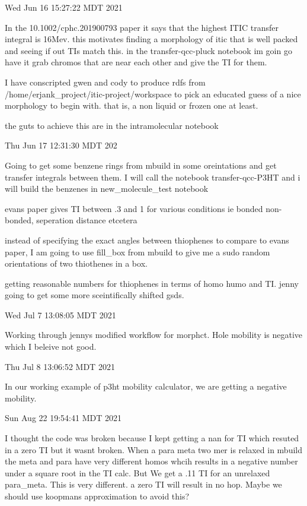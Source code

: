 
Wed Jun 16 15:27:22 MDT 2021
    
       In the 10.1002/cphc.201900793 paper it says that the highest ITIC transfer integral 
       is 16Mev. this motivates finding a morphology of itic that is well packed and 
       seeing if out TIs match this. in the transfer-qcc-pluck notebook im goin go 
       have it grab chromos that are near each other and give the TI for them.
    
        I have conscripted gwen and cody to produce rdfs from /home/erjank_project/itic-project/workspace 
        to pick an educated guess of a nice morphology to begin with. that is, a non liquid or frozen one
        at least.

        the guts to achieve this are in the intramolecular notebook

Thu Jun 17 12:31:30 MDT 202

      Going to get some benzene rings from mbuild in some oreintations and get transfer integrals 
      between them. I will call the notebook transfer-qcc-P3HT and i will build the benzenes in 
      new_molecule_test notebook

      evans paper gives TI between .3 and 1 for various conditions ie bonded non-bonded, seperation
      distance etcetera

      instead of specifying the exact angles between thiophenes to compare to evans paper,
      I am going to use fill_box from mbuild to give me a sudo random orientations of two
      thiothenes in a box.

      getting reasonable numbers for thiophenes in terms of homo humo and TI. jenny going to get
      some more sceintifically shifted gsds.
      

Wed Jul  7 13:08:05 MDT 2021

      Working through jennys modified workflow for morphct. Hole mobility is negative which I beleive
      not good.

Thu Jul  8 13:06:52 MDT 2021
        
     In our working example of p3ht mobility calculator, we are getting a negative mobility. 

Sun Aug 22 19:54:41 MDT 2021
    
    I thought the code was broken because I kept getting a nan for TI which resuted in a zero TI
    but it wasnt broken. When a para meta two mer is relaxed in mbuild the meta and para have very different
    homos whcih results in a negative number under a square root in the TI calc. But We get a .11 TI for an
    unrelaxed para_meta. This is very different. a zero TI will result in no hop. Maybe we should use koopmans
    approximation to avoid this?

